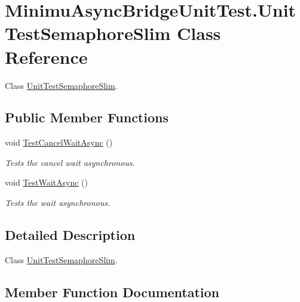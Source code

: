 \hypertarget{class_minimu_async_bridge_unit_test_1_1_unit_test_semaphore_slim}{}\section{Minimu\+Async\+Bridge\+Unit\+Test.\+Unit\+Test\+Semaphore\+Slim Class Reference}
\label{class_minimu_async_bridge_unit_test_1_1_unit_test_semaphore_slim}


Class \hyperlink{class_minimu_async_bridge_unit_test_1_1_unit_test_semaphore_slim}{Unit\+Test\+Semaphore\+Slim}.  


\subsection*{Public Member Functions}
\begin{DoxyCompactItemize}
\item 
void \hyperlink{class_minimu_async_bridge_unit_test_1_1_unit_test_semaphore_slim_a1b598aed47dfae6839145ea34d231131}{Test\+Cancel\+Wait\+Async} ()
\begin{DoxyCompactList}\small\item\em Tests the cancel wait asynchronous. \end{DoxyCompactList}\item 
void \hyperlink{class_minimu_async_bridge_unit_test_1_1_unit_test_semaphore_slim_a4619e0dce995d83279ad8f057740af95}{Test\+Wait\+Async} ()
\begin{DoxyCompactList}\small\item\em Tests the wait asynchronous. \end{DoxyCompactList}\end{DoxyCompactItemize}


\subsection{Detailed Description}
Class \hyperlink{class_minimu_async_bridge_unit_test_1_1_unit_test_semaphore_slim}{Unit\+Test\+Semaphore\+Slim}. 



\subsection{Member Function Documentation}
\mbox{\label{class_minimu_async_bridge_unit_test_1_1_unit_test_semaphore_slim_a1b598aed47dfae6839145ea34d231131}} 
